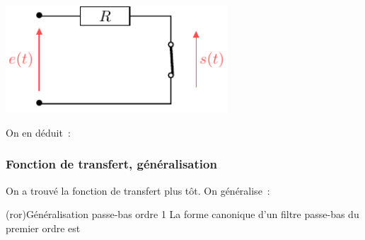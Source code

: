 \documentclass[../../main/main.tex]{subfiles}
\begin{document}
\begin{isd}[sidebyside align=top]
\begin{center}
{		}{%
			\includegraphics[height=4cm]{filtre_rc-hf}
		}%
		\vspace{-15pt}
	\end{center}
	On en déduit~:
	\vspace{-15pt}
\end{isd}

\subsubsection{Fonction de transfert, généralisation}
On a trouvé la fonction de transfert plus tôt. On généralise~:
\begin{tcb}(ror){Généralisation passe-bas ordre 1}
	La forme canonique d'un filtre passe-bas du premier ordre est
	\psw{%
		\[
			\boxed{\Hu(x) = \frac{H_0}{1+\jx}}
			\qav
			H_0 = \cte
			\qet
			x = \frac{\w}{\w_c}
			\qet
			\w_c = \frac{1}{RC}
		\]
	}%
	\vspace{-15pt}
\end{tcb}
\end{document}
